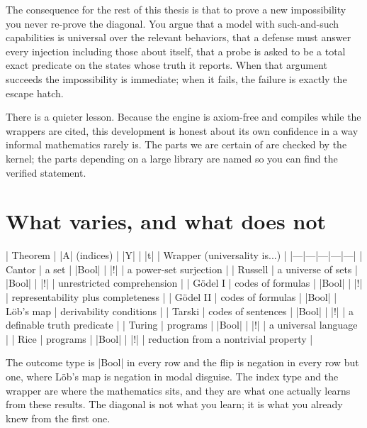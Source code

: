 \documentclass{memoir}
\begin{document}
The consequence for the rest of this thesis is that to prove a new impossibility
you never re-prove the diagonal. You argue that a model with such-and-such
capabilities is universal over the relevant behaviors, that a defense must
answer every injection including those about itself, that a probe is asked to be
a total exact predicate on the states whose truth it reports. When that argument
succeeds the impossibility is immediate; when it fails, the failure is exactly
the escape hatch.

There is a quieter lesson. Because the engine is axiom-free and compiles while
the wrappers are cited, this development is honest about its own confidence in a
way informal mathematics rarely is. The parts we are certain of are checked by
the kernel; the parts depending on a large library are named so you can find the
verified statement.



\section{What varies, and what does not}\label{Two--Schemas--of--Impossibility-005F-005F-005F--Machine--Checked--Limits--of--Trustworthy--Machine--Learning-005F-005F-005F--and--Why--They--Tighten--with--Capability----The--Classical--Limits----What--varies-005F-005F-005F--and--what--does--not}

| Theorem | \LeanVerb|A| (indices) | \LeanVerb|Y| | \LeanVerb|t| | Wrapper (universality is...) |
|---|---|---|---|---|
| Cantor | a set | \LeanVerb|Bool| | \LeanVerb|!| | a power-set surjection |
| Russell | a universe of sets | \LeanVerb|Bool| | \LeanVerb|!| | unrestricted comprehension |
| Gödel I | codes of formulas | \LeanVerb|Bool| | \LeanVerb|!| | representability plus completeness |
| Gödel II | codes of formulas | \LeanVerb|Bool| | Löb's map | derivability conditions |
| Tarski | codes of sentences | \LeanVerb|Bool| | \LeanVerb|!| | a definable truth predicate |
| Turing | programs | \LeanVerb|Bool| | \LeanVerb|!| | a universal language |
| Rice | programs | \LeanVerb|Bool| | \LeanVerb|!| | reduction from a nontrivial property |

The outcome type is \LeanVerb|Bool| in every row and the flip is negation in every row
but one, where Löb's map is negation in modal disguise. The index type and the
wrapper are where the mathematics sits, and they are what one actually learns
from these results. The diagonal is not what you learn; it is what you already
knew from the first one.
\end{document}
